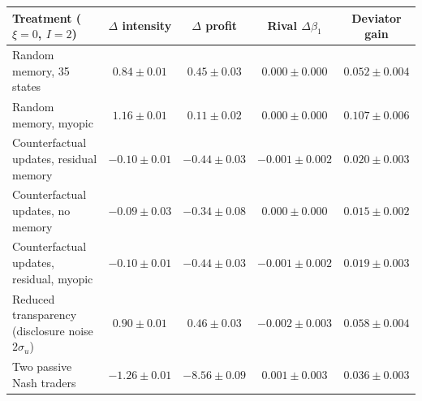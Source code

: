 \begin{tabular}{lcccc}
\toprule
Treatment ($\xi=0$, $I=2$) & $\Delta$ intensity & $\Delta$ profit & Rival $\Delta\beta_1$ & Deviator gain \\
\midrule
Random memory, 35 states & $0.84 \pm 0.01$ & $0.45 \pm 0.03$ & $0.000 \pm 0.000$ & $0.052 \pm 0.004$ \\
Random memory, myopic & $1.16 \pm 0.01$ & $0.11 \pm 0.02$ & $0.000 \pm 0.000$ & $0.107 \pm 0.006$ \\
Counterfactual updates, residual memory & $-0.10 \pm 0.01$ & $-0.44 \pm 0.03$ & $-0.001 \pm 0.002$ & $0.020 \pm 0.003$ \\
Counterfactual updates, no memory & $-0.09 \pm 0.03$ & $-0.34 \pm 0.08$ & $0.000 \pm 0.000$ & $0.015 \pm 0.002$ \\
Counterfactual updates, residual, myopic & $-0.10 \pm 0.01$ & $-0.44 \pm 0.03$ & $-0.001 \pm 0.002$ & $0.019 \pm 0.003$ \\
Reduced transparency (disclosure noise $2\sigma_u$) & $0.90 \pm 0.01$ & $0.46 \pm 0.03$ & $-0.002 \pm 0.003$ & $0.058 \pm 0.004$ \\
Two passive Nash traders & $-1.26 \pm 0.01$ & $-8.56 \pm 0.09$ & $0.001 \pm 0.003$ & $0.036 \pm 0.003$ \\
\bottomrule
\end{tabular}